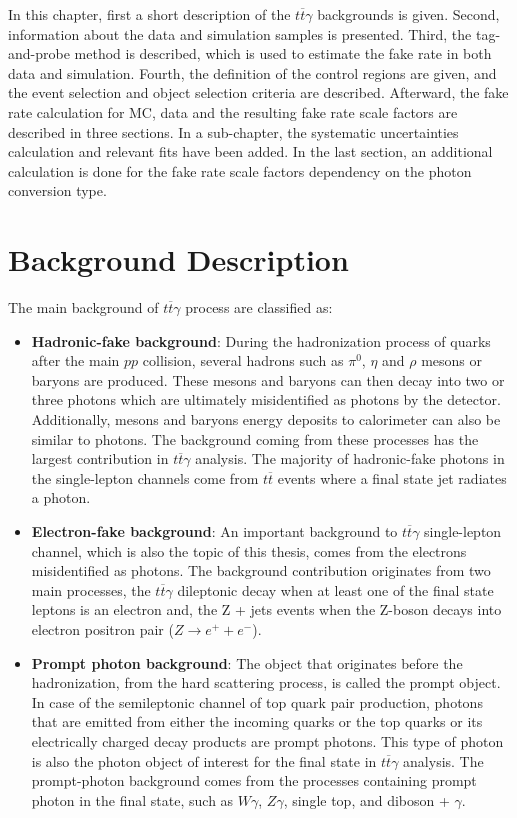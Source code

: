 In this chapter, first a short description of the $t\overline{t}\gamma$ backgrounds is given. Second, information about the data and simulation samples is presented. Third, the tag-and-probe method is described, which is used to estimate the fake rate in both data and simulation. Fourth, the definition of the control regions are given, and the event selection and object selection criteria are described. Afterward, the fake rate calculation for MC, data and the resulting fake rate scale factors are described in three sections. In a sub-chapter, the systematic uncertainties calculation and relevant fits have been added. In the last section, an additional calculation is done for the fake rate scale factors dependency on the photon conversion type.

\section{Background Description}

The main background of $t\overline{t}\gamma$ process are classified as:

\begin{itemize}
\item \textbf{Hadronic-fake background}: During the hadronization process of quarks after the main $pp$ collision, several hadrons such as $\pi^{0}$, $\eta$ and $\rho$ mesons or baryons are produced. These mesons and baryons can then decay into two or three photons which are ultimately misidentified as photons by the detector. Additionally, mesons and baryons energy deposits to calorimeter can also be similar to photons. The background coming from these processes has the largest contribution in $t\overline{t}\gamma$ analysis. The majority of hadronic-fake photons in the single-lepton channels come from $t\overline{t}$ events where a final state jet radiates a photon.

\item \textbf{Electron-fake background}: An important background to $t\overline{t}\gamma$ single-lepton channel, which is also the topic of this thesis, comes from the electrons misidentified as photons. The background contribution originates from two main processes, the $t\overline{t}\gamma$ dileptonic decay when at least one of the final state leptons is an electron and, the Z + jets events when the Z-boson decays into electron positron pair ($Z \rightarrow e^{+} + e^{-}$).

\item \textbf{Prompt photon background}: The object that originates before the hadronization, from the hard scattering process, is called the prompt object. In case of the semileptonic channel of top quark pair production, photons that are emitted from either the incoming quarks or the top quarks or its electrically charged decay products are prompt photons. This type of photon is also the photon object of interest for the final state in $t\overline{t}\gamma$ analysis. The prompt-photon background comes from the processes containing prompt photon in the final state, such as $W\gamma$, $Z\gamma$, single top, and diboson + $\gamma$.
\end{itemize}

